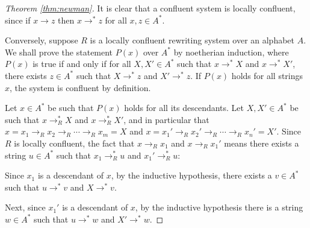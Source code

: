 \documentclass[nosubthm]{lmaths}
\begin{document}
\begin{proof}[Theorem \ref{thm:newman}]
	It is clear that a confluent system is locally confluent, since if $x \to z$ then $x \to^* z$ for all $x, z \in A^*$.

	Conversely, suppose $R$ is a locally confluent rewriting system over an alphabet $A$. We shall prove the statement $P(x)$ over $A^*$ by noetherian induction, where $P(x)$ is true if and only if for all $X, X' \in A^*$ such that $x \to^* X$ and $x \to^* X'$, there exists $z \in A^*$ such that $X \to^* z$ and $X' \to^* z$. If $P(x)$ holds for all strings $x$, the system is confluent by definition. 

	Let $x \in A^*$ be such that $P(x)$ holds for all its descendants. Let $X, X' \in A^*$ be such that $x \to_R^* X$ and $x \to_R^* X'$, and in particular that $x = x_1 \to_R x_2 \to_R \cdots \to_R x_m = X$ and $x = x_1' \to_R x_2' \to_R \cdots \to_R x_n' = X'$. Since $R$ is locally confluent, the fact that $x \to_R x_1$ and $x \to_R x_1'$ means there exists a string $u \in A^*$ such that $x_1 \to_R^* u$ and $x_1' \to_R^* u$:

	{\centering
	\par}

	Since $x_1$ is a descendant of $x$, by the inductive hypothesis, there exists a $v \in A^*$ such that $u \to^* v$ and $X \to^* v$.

	{\centering
	\par}

	Next, since $x_1'$ is a descendant of $x$, by the inductive hypothesis there is a string $w \in A^*$ such that $u \to^* w$ and $X' \to^* w$.

	{\centering
	\par}


\end{proof}
\end{document}
